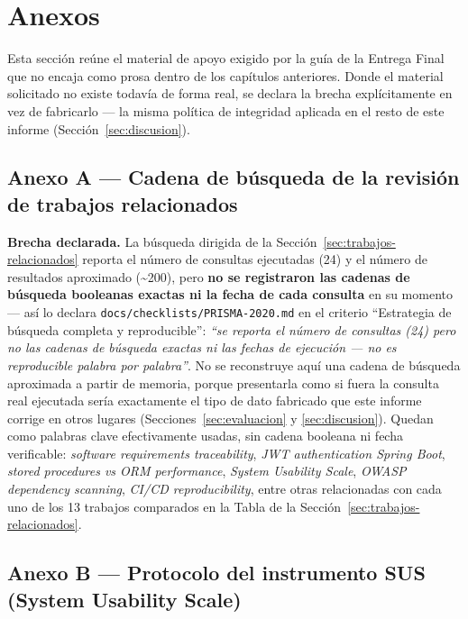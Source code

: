 \section{Anexos}
\label{sec:anexos}

Esta sección reúne el material de apoyo exigido por la guía de la Entrega Final que no encaja como
prosa dentro de los capítulos anteriores. Donde el material solicitado no existe todavía de forma real,
se declara la brecha explícitamente en vez de fabricarlo --- la misma política de integridad aplicada en
el resto de este informe (Sección~\ref{sec:discusion}).

\subsection{Anexo A --- Cadena de búsqueda de la revisión de trabajos relacionados}
\label{anexo:busqueda}

\textbf{Brecha declarada.} La búsqueda dirigida de la Sección~\ref{sec:trabajos-relacionados} reporta el
número de consultas ejecutadas (24) y el número de resultados aproximado (\textasciitilde200), pero
\textbf{no se registraron las cadenas de búsqueda booleanas exactas ni la fecha de cada consulta} en su
momento --- así lo declara \texttt{docs/checklists/PRISMA-2020.md} en el criterio ``Estrategia de
búsqueda completa y reproducible'': \textit{``se reporta el número de consultas (24) pero no las
cadenas de búsqueda exactas ni las fechas de ejecución --- no es reproducible palabra por palabra''}. No
se reconstruye aquí una cadena de búsqueda aproximada a partir de memoria, porque presentarla como si
fuera la consulta real ejecutada sería exactamente el tipo de dato fabricado que este informe corrige en
otros lugares (Secciones~\ref{sec:evaluacion} y \ref{sec:discusion}). Quedan como palabras clave
efectivamente usadas, sin cadena booleana ni fecha verificable: \textit{software requirements
traceability}, \textit{JWT authentication Spring Boot}, \textit{stored procedures vs ORM performance},
\textit{System Usability Scale}, \textit{OWASP dependency scanning}, \textit{CI/CD reproducibility},
entre otras relacionadas con cada uno de los 13 trabajos comparados en la Tabla de la
Sección~\ref{sec:trabajos-relacionados}.

\subsection{Anexo B --- Protocolo del instrumento SUS (System Usability Scale)}
\label{anexo:sus}

